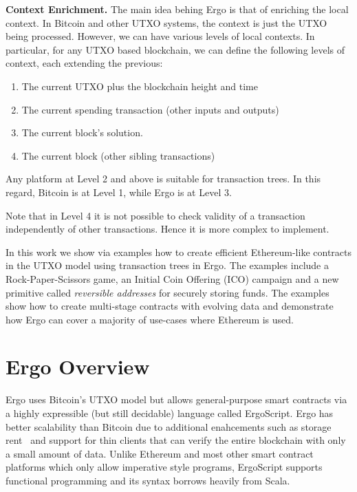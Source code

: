 \documentclass[runningheads]{llncs}
\newcommand{\langname}{ErgoScript\xspace}
\begin{document}
\textbf{Context Enrichment.} The main idea behing Ergo is that of enriching the local context. In Bitcoin and other UTXO systems, the context is just the UTXO being processed. However, we can have various levels of local contexts.
In particular, for any UTXO based blockchain, we can define the following levels of context, each extending the previous:
\begin{enumerate}
	\item The current UTXO plus the blockchain height and time
	\item The current spending transaction (other inputs and outputs)
	\item The current block's solution.
	\item The current block (other sibling transactions)
\end{enumerate}

Any platform at Level 2 and above is suitable for transaction trees. In this regard, Bitcoin is at Level 1, while Ergo is at Level 3. 

Note that in Level 4 it is not possible to check validity of a transaction independently of other transactions. Hence it is more complex to implement. 

In this work we show via examples how to create efficient Ethereum-like contracts in the UTXO model using transaction trees in Ergo. 
The examples include a Rock-Paper-Scissors game, an Initial Coin Offering (ICO) campaign and a new primitive called {\em reversible addresses} for securely storing funds. The examples show how to create multi-stage contracts with evolving data and demonstrate how Ergo can cover a majority of use-cases where Ethereum is used.  


\section{Ergo Overview}
\label{ergo-overview}

Ergo uses Bitcoin's UTXO model but allows general-purpose smart contracts via a highly expressible (but still decidable) language called \langname. Ergo has better scalability than Bitcoin due to additional enahcements such as storage rent~\cite{chepurnoy2018systematic} and support for thin clients that can verify the entire blockchain with only a small amount of data. Unlike Ethereum and most other smart contract platforms which only allow imperative style programs, \langname supports functional programming and its syntax borrows heavily from Scala. 
\end{document}
